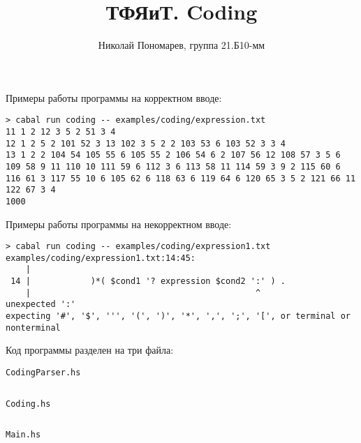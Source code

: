 \documentclass[12pt, oneside]{memoir}
\title{ТФЯиТ. Coding}
\author{Николай Пономарев, группа 21.Б10-мм}
\begin{document}
\maketitle

Примеры работы программы на корректном вводе:
\begin{verbatim}
> cabal run coding -- examples/coding/expression.txt
11 1 2 12 3 5 2 51 3 4
12 1 2 5 2 101 52 3 13 102 3 5 2 2 103 53 6 103 52 3 3 4
13 1 2 2 104 54 105 55 6 105 55 2 106 54 6 2 107 56 12 108 57 3 5 6 109 58 9 11 110 10 111 59 6 112 3 6 113 58 11 114 59 3 9 2 115 60 6 116 61 3 117 55 10 6 105 62 6 118 63 6 119 64 6 120 65 3 5 2 121 66 11 122 67 3 4
1000
\end{verbatim}

Примеры работы программы на некорректном вводе:
\begin{verbatim}
> cabal run coding -- examples/coding/expression1.txt
examples/coding/expression1.txt:14:45:
    |
 14 |            )*( $cond1 '? expression $cond2 ':' ) .
    |                                             ^
unexpected ':'
expecting '#', '$', ''', '(', ')', '*', ',', ';', '[', or terminal or nonterminal
\end{verbatim}

Код программы разделен на три файла:

\texttt{CodingParser.hs}
\inputminted[breaklines]{haskell}{../../src/CodingParser.hs}
\texttt{Coding.hs}
\inputminted[breaklines]{haskell}{../../src/Coding.hs}
\texttt{Main.hs}
\inputminted[breaklines]{haskell}{../../app/coding/Main.hs}
\end{document}
